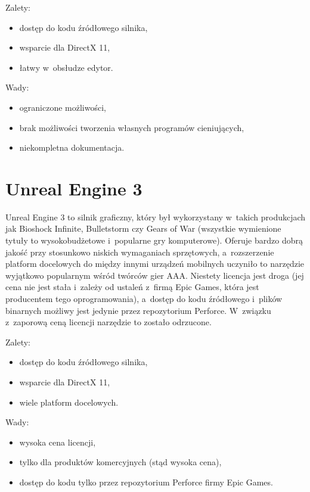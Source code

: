 {\raggedright Zalety:
\begin{itemize}
\item dostęp do kodu źródłowego silnika,
\item wsparcie dla DirectX 11,
\item łatwy w~obsłudze edytor.
\end{itemize}

Wady:
\begin{itemize}
\item ograniczone możliwości,
\item brak możliwości tworzenia własnych programów cieniujących,
\item niekompletna dokumentacja.
\end{itemize}
}

\section{Unreal Engine 3}

Unreal Engine 3 to silnik graficzny, który był wykorzystany w~takich produkcjach jak Bioshock Infinite, Bulletstorm czy Gears of War (wszystkie wymienione tytuły to wysokobudżetowe i~popularne gry komputerowe). Oferuje bardzo dobrą jakość przy stosunkowo niskich wymaganiach sprzętowych, a~rozszerzenie platform docelowych do między innymi urządzeń mobilnych uczyniło to narzędzie wyjątkowo popularnym wśród twórców gier AAA. Niestety licencja jest droga (jej cena nie jest stała i~zależy od ustaleń z~firmą Epic Games, która jest producentem tego oprogramowania), a~dostęp do kodu źródłowego i~plików binarnych możliwy jest jedynie przez repozytorium Perforce. W~związku z~zaporową ceną licencji narzędzie to zostało odrzucone.\\

{\raggedright Zalety:
\begin{itemize}
\item dostęp do kodu źródłowego silnika,
\item wsparcie dla DirectX 11,
\item wiele platform docelowych.
\end{itemize}

Wady:
\begin{itemize}
\item wysoka cena licencji,
\item tylko dla produktów komercyjnych (stąd wysoka cena),
\item dostęp do kodu tylko przez repozytorium Perforce firmy Epic Games.
\end{itemize}
}

